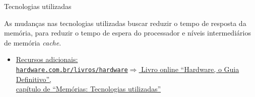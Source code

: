 \begin{frame}{Tecnologias utilizadas}

As mudanças nas tecnologias utilizadas buscar reduzir o tempo de
resposta da memória, para reduzir o tempo de espera do processador e
níveis intermediários de memória {\it cache\/}.

\begin{itemize}
\item
  \href{http://www.hardware.com.br/livros/hardware/tecnologias-utilizadas.html}
  {Recursos adicionais:\\{\tt hardware.com.br/livros/hardware$\Rightarrow$} Livro online
    ``Hardware, o Guia Definitivo'', \\capítulo de ``Memórias: Tecnologias utilizadas''}
\end{itemize}

\end{frame}


\title{\insertlecture}
\frame{\maketitle}

\section{\insertlecture}

\def\cachebusmem{
\begin{tikzpicture}
		\tikzset{dev/.style={draw},com/.style={>=latex}}
		\node[dev] (p) {processador};
		\node[dev] (c) [right of=p,xshift=15mm] {cache};
		\node[dev,minimum height=3cm,minimum width=.25cm,fill=black] (b) [right of=c,xshift=12.5mm] {};
		\node[] [above of=b,yshift=10mm] {barramento};
		\node[dev,minimum height=1.75cm] (m) [right of=b,xshift=15mm,text width=1.5cm] {memória principal};		
		

		\draw[<->,com] (p) -- (c);
		\draw[<->,com] (c) -- (b);
		\draw[<->,com] (b) -- (m);
\end{tikzpicture}
}	



